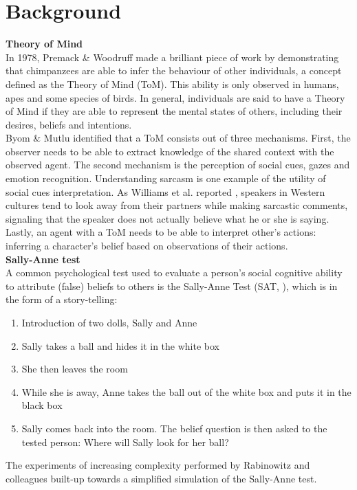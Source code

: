 \documentclass[twocolumn,superscriptaddress,aps]{revtex4-1}
\begin{document}
\section{Background}\label{sec:background}

\noindent \textbf{Theory of Mind} \\[0.15cm]
In 1978, Premack \& Woodruff made a brilliant piece of work \cite{Woodruff} by demonstrating that chimpanzees are able to infer the behaviour of other individuals, a concept defined as the Theory of Mind (ToM). This ability is only observed in humans, apes and some species of birds. In general, individuals are said to have a Theory of Mind if they are able to represent the mental states of others, including their desires, beliefs and intentions. \\

\indent Byom \& Mutlu \cite{Mutlu} identified that a ToM consists out of three mechanisms. First, the observer needs to be able to extract knowledge of the shared context with the observed agent. The second mechanism is the perception of social cues, gazes and emotion recognition. Understanding sarcasm is one example of the utility of social cues interpretation. As Williams et al. reported \cite{williams}, speakers in Western cultures tend to look away from their partners while making sarcastic comments, signaling that the speaker does not actually believe what he or she is saying. Lastly, an agent with a ToM needs to be able to interpret other's actions: inferring a character's belief based on observations of their actions.\\

\noindent \textbf{Sally-Anne test} \\[0.15cm]
A common psychological test used to evaluate a person's social cognitive ability to attribute (false) beliefs to others is the Sally-Anne Test (SAT, \cite{wimmer}), which is in the form of a story-telling:
\begin{enumerate}
\item Introduction of two dolls, Sally and Anne
\item Sally takes a ball and hides it in the white box
\item She then leaves the room 
\item While she is away, Anne takes the ball out of the white box and puts it in the black box
\item Sally comes back into the room. The belief question is then asked to the tested person: Where will Sally look for her ball?
\end{enumerate}
The experiments of increasing complexity performed by Rabinowitz and colleagues built-up towards a simplified simulation of the Sally-Anne test. \\
\end{document}
